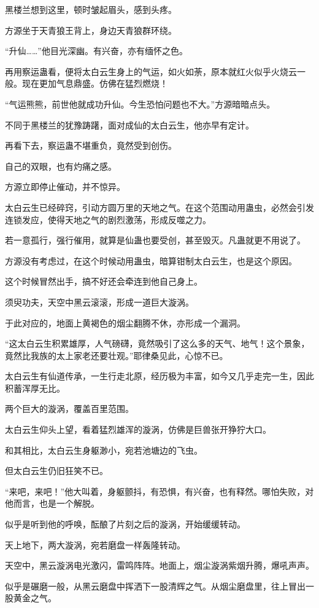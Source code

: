 \begin{this_body}
黑楼兰想到这里，顿时皱起眉头，感到头疼。

方源坐于天青狼王背上，身边天青狼群环绕。

“升仙……”他目光深幽。有兴奋，亦有缅怀之色。

再用察运蛊看，便将太白云生身上的气运，如火如荼，原本就红火似乎火烧云一般。现在更加气息鼎盛。仿佛在猛烈燃烧！

“气运熊熊，前世他就成功升仙。今生恐怕问题也不大。”方源暗暗点头。

不同于黑楼兰的犹豫踌躇，面对成仙的太白云生，他亦早有定计。

再看下去，察运蛊不堪重负，竟然受到创伤。

自己的双眼，也有灼痛之感。

方源立即停止催动，并不惊异。

太白云生已经碎窍，引动方圆万里的天地之气。在这个范围动用蛊虫，必然会引发连锁发应，使得天地之气的剧烈激荡，形成反噬之力。

若一意孤行，强行催用，就算是仙蛊也要受创，甚至毁灭。凡蛊就更不用说了。

方源没有考虑过，在这个时候动用蛊虫，暗算钳制太白云生，也是这个原因。

这个时候冒然出手，搞不好还会牵连到他自己身上。

须臾功夫，天空中黑云滚滚，形成一道巨大漩涡。

于此对应的，地面上黄褐色的烟尘翻腾不休，亦形成一个漏洞。

“这太白云生积累雄厚，人气磅礴，竟然吸引了这么多的天气、地气！这个景象，竟然比我族的太上家老还要壮观。”耶律桑见此，心惊不已。

太白云生有仙道传承，一生行走北原，经历极为丰富，如今又几乎走完一生，因此积蓄浑厚无比。

两个巨大的漩涡，覆盖百里范围。

太白云生仰头上望，看着猛烈雄浑的漩涡，仿佛是巨兽张开狰狞大口。

和其相比，太白云生身躯渺小，宛若池塘边的飞虫。

但太白云生仍旧狂笑不已。

“来吧，来吧！”他大叫着，身躯颤抖，有恐惧，有兴奋，也有释然。哪怕失败，对他而言，也是一个解脱。

似乎是听到他的呼唤，酝酿了片刻之后的漩涡，开始缓缓转动。

天上地下，两大漩涡，宛若磨盘一样轰隆转动。

天空中，黑云漩涡电光激闪，雷鸣阵阵。地面上，烟尘漩涡紫烟升腾，爆吼声声。

似乎是碾磨一般，从黑云磨盘中挥洒下一股清辉之气。从烟尘磨盘里，往上冒出一股黄金之气。


\end{this_body}
